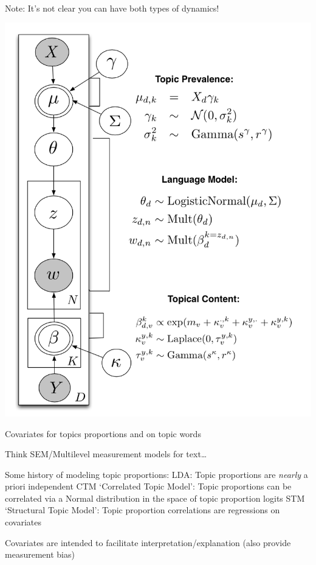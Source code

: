 \documentclass{mediumfoils}
\begin{document}
~\\
Note:
\ita
\itm It's not clear you can have both types of dynamics!
\itz


\centerline{\includegraphics[scale=.6]{pictures/stm-graphical-model}}

Covariates for topics proportions and on topic words


Think SEM/Multilevel measurement models for text\ldots  

Some history of modeling topic proportions:
\ita
\itm LDA: Topic proportions are \textit{nearly} a priori independent 
\itm CTM `Correlated Topic Model': Topic proportions can be correlated via a Normal distribution in the space of topic proportion logits
\itm STM `Structural Topic Model': Topic proportion correlations are regressions on covariates 
\itz

Covariates are intended to facilitate interpretation/explanation (also provide measurement bias)
\end{document}
